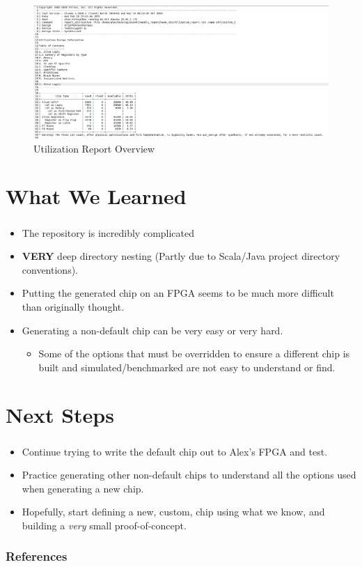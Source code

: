 \documentclass{../weeklyslides}
\begin{document}
\begin{frame}
	\begin{figure}[H]
		\centering
		\includegraphics[width=0.7\linewidth]{Report_Overview}
		\caption{Utilization Report Overview}
		\label{fig:reportoverview}
	\end{figure}

\end{frame}

\section{What We Learned}\label{sec:What_We_Learned}
\begin{frame}
  \frametitle{}
  \begin{itemize}
  \item The repository is incredibly complicated
  \item \textbf{VERY} deep directory nesting (Partly due to Scala/Java project directory conventions).
  \item Putting the generated chip on an FPGA seems to be much more difficult than originally thought.
  \item Generating a non-default chip can be very easy or very hard.
    \begin{itemize}
    \item Some of the options that must be overridden to ensure a different chip is built and simulated/benchmarked are not easy to understand or find.
    \end{itemize}
  \end{itemize}
\end{frame}


\section{Next Steps}\label{sec:Next_Steps}
\begin{frame}
  \frametitle{}
  \begin{itemize}
  \item Continue trying to write the default chip out to Alex's FPGA and test.
  \item Practice generating other non-default chips to understand all the options used when generating a new chip.
  \item Hopefully, start defining a new, custom, chip using what we know, and building a \emph{very} small proof-of-concept.
  \end{itemize}
\end{frame}

\begin{frame}
  \frametitle{References}
  \printbibliography[heading=bibintoc]{}
\end{frame}
\end{document}

